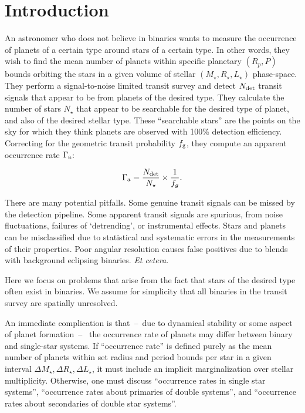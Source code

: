 \documentclass{emulateapj}
\begin{document}

\section{Introduction}

An astronomer who does not believe in binaries wants to measure the
occurrence of planets of a certain type around stars of a certain type.
In other words, they wish to find the mean number of planets within specific 
planetary $(R_p, P)$ bounds orbiting the stars in a given volume 
of stellar $(M_\star, R_\star, L_\star)$ phase-space.
They perform a signal-to-noise limited transit survey and detect $N_{\rm det}$ 
transit signals that appear to be from planets of the desired type.  They 
calculate the number of stars $N_\star$ that appear to be searchable for the 
desired type of planet, and also of the desired stellar type.  These 
``searchable stars'' are the points on the sky for which they think planets 
are observed with 100\% detection efficiency. Correcting for the geometric 
transit probability $f_{\rm g}$, they compute an apparent occurrence rate 
$\Gamma_{\rm a}$:

\begin{equation}
\Gamma_{\rm a} = \frac{N_{\rm det}}{N_\star} \times \frac{1}{f_g}.
\end{equation}

There are many potential pitfalls.  Some genuine transit signals can be missed
by the detection pipeline.  Some apparent transit signals are spurious, from
noise fluctuations, failures of `detrending', or instrumental effects.  Stars
and planets can be misclassified due to statistical and systematic errors in
the measurements of their properties.  Poor angular resolution causes false
positives due to blends with background eclipsing binaries. {\it Et cetera}.

Here we focus on problems that arise from the fact that stars of the desired
type often exist in binaries. 
We assume for simplicity that all binaries in the transit survey are 
spatially unresolved.

An immediate complication is that~--~due to dynamical stability or some 
aspect of planet formation~--~ the occurrence rate of planets may differ 
between binary and single-star systems.
If ``occurrence rate'' is defined purely as the mean number of planets within 
set radius and period bounds per star in a given interval $\Delta M_\star, 
\Delta R_\star, \Delta L_\star$, it must include an implicit marginalization 
over stellar multiplicity.
Otherwise, one must discuss ``occurrence rates in single star systems'', 
``occurrence rates about primaries of double systems'', and
``occurrence rates about secondaries of double star systems''.
\end{document}
